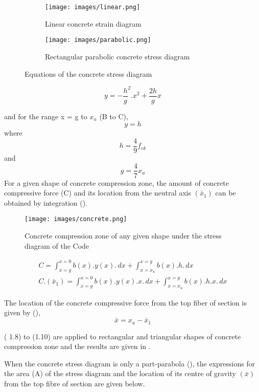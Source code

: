 \begin{figure}
\begin{subfigure}{0.5\textwidth}
\centering
\texttt{[image: images/linear.png]}
\caption{Linear concrete strain diagram}
\label{fig:linear}
\end{subfigure}
%
\begin{subfigure}{0.5\textwidth}
\centering
\texttt{[image: images/parabolic.png]}
\caption{Rectangular parabolic concrete stress diagram}
\label{fig:parabolic}
\end{subfigure}
\caption{Equations of the concrete stress diagram}
\label{fig:equations}
\end{figure}

\begin{equation}
y=-\frac{h}{g}^2.x^2+\frac{2h}{g} x
\end{equation}

and for the range x = g to $x_{u}$ (B to C),
\begin{equation}
y=h
\end{equation}
where
$$h=\frac{4}{9}f_{ck}$$
and
$$g=\frac{4}{7}x_u$$
For a given shape of concrete compression zone, the amount of concrete
compressive force (C) and its location from the neutral axis ${(\bar x_1)}$
can be obtained by integration ().

\begin{figure}
\centering
\texttt{[image: images/concrete.png]}
\caption{Concrete compression zone of any given shape under the stress diagram of the Code}
\label{fig:concrete}
\end{figure}

\begin{align}
C=\int_{x=g}^{x=0}b(x).y(x).\,dx+\int_{{x=x_u}}^{x=g}b(x).h.\,dx\\
C.(\bar x_1)=\int_{x=g}^{x=0}b(x).y(x).x.\,dx+\int_{{x=x_u}}^{x=g}b(x).h.x.\,dx
\end{align}

The location of the concrete compressive force from the top fiber of 
section is given by (),
\begin{equation}
\bar x=x_u-\bar x_1
\end{equation}

\eqn ( 1.8) to \eqn (1.10) are applied to rectangular and triangular
shapes of concrete compression zone and the results are given in .

When the concrete stress diagram is only a part-parabola (), 
the expressions for the area (A) of the stress diagram and the location
of its centre of gravity ${(\bar x)}$ from the top fibre of section are
given below.


